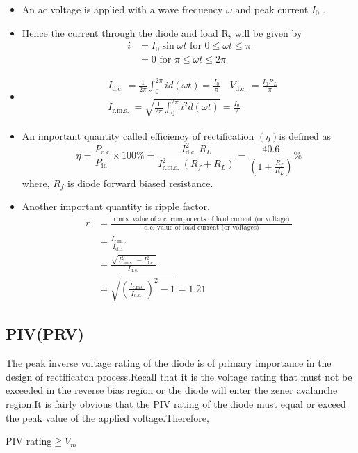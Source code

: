 \begin{note}
\begin{itemize}
	\item An ac voltage is applied with a wave frequency $\omega$ and peak current $I_{0}$ .
	\item Hence the current through the diode and load R, will be given by
	$$\begin{aligned}
	i &=I_{0} \sin \omega t \text { for } 0 \leq \omega t \leq \pi \\
	&=0 \text { for } \pi \leq \omega t \leq 2 \pi
	\end{aligned}$$
	\item
	$$ \begin{aligned}
	&I_{\text {d.c. }}=\frac{1}{2 \pi} \int_{0}^{2 \pi} i d(\omega t)=\frac{I_{0}}{\pi} \quad V_{\text {d.c. }}=\frac{I_{0} R_{L}}{\pi} \\
	&I_{\text {r.m.s. }}=\sqrt{\frac{1}{2 \pi} \int_{0}^{2 \pi} i^{2} d(\omega t)}=\frac{I_{0}}{2}
	\end{aligned}
	$$
	\item An important quantity called efficiency of rectification $(\eta) $is defined as
	$$
	\eta=\frac{P_{\mathrm{d} . \mathrm{c}}}{P_{\text {in }}} \times 100 \%=\frac{I_{\text {d.c. }}^{2} R_{L}}{I_{\text {r.m.s. }}^{2}\left(R_{f}+R_{L}\right)}=\frac{40.6}{\left(1+\frac{R_{f}}{R_{L}}\right)} \%
	$$
	where, $R_{f}$ is diode forward biased resistance.
	\item Another important quantity is ripple factor. 
	$$\begin{aligned}
	r&=\frac{\text { r.m.s. value of a.c. components of load current (or voltage) }}{\text { d.c. value of load current (or voltages) }}\\
	&=\frac{I_{\text {r.m. } .}}{I_{\text {d.c. }}}\\&=\frac{\sqrt{I_{\text {r.m.s. }}^{2}-I_{\text {d.c. }}^{2}}}{I_{\text {d.c. }}}\\&=\sqrt{\left(\frac{I_{\text {r.ms. }}}{I_{\text {d.c. }}}\right)^{2}-1}=1.21
	\end{aligned}
	$$
\end{itemize}
\end{note}
\subsection{PIV(PRV)}
The peak inverse voltage rating of the diode is of primary importance in the design of rectificaton process.Recall that it is the voltage rating that must not be exceeded in the reverse bias region or the diode will enter the zener avalanche region.It is fairly obvious that the PIV rating of the diode must equal or exceed the peak value of the applied voltage.Therefore,
\begin{center}
PIV rating$\geqq V_m$
\end{center}         
